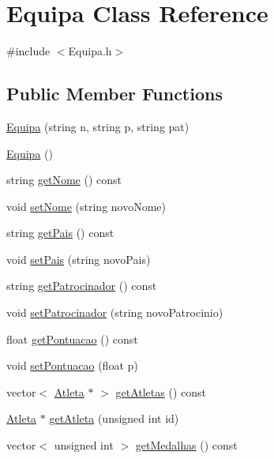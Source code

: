 \hypertarget{class_equipa}{}\section{Equipa Class Reference}
\label{class_equipa}


{\ttfamily \#include $<$Equipa.\+h$>$}

\subsection*{Public Member Functions}
\begin{DoxyCompactItemize}
\item 
\hyperlink{class_equipa_a2721072fa0d6b4451d22fdfe3c3f3c0e}{Equipa} (string n, string p, string pat)
\item 
\hyperlink{class_equipa_a71e864835165c2be093784ef38fd634d}{Equipa} ()
\item 
string \hyperlink{class_equipa_a9d20d0c8daa94e7562c5ea173337a224}{get\+Nome} () const 
\item 
void \hyperlink{class_equipa_a13e90216eb9ca9d6b2c144295a2b6730}{set\+Nome} (string novo\+Nome)
\item 
string \hyperlink{class_equipa_ac0d2108875ef6ed5833bfbd2f9921625}{get\+Pais} () const 
\item 
void \hyperlink{class_equipa_a2360f13c75fdcf75395cef84a9d0f589}{set\+Pais} (string novo\+Pais)
\item 
string \hyperlink{class_equipa_a241ab40d7dfe77af53b834482c79b94f}{get\+Patrocinador} () const 
\item 
void \hyperlink{class_equipa_aca1891ba657401bff00291ab22bb430a}{set\+Patrocinador} (string novo\+Patrocinio)
\item 
float \hyperlink{class_equipa_aeccebdc0af7faf1553e7c7eefe9e66af}{get\+Pontuacao} () const 
\item 
void \hyperlink{class_equipa_a9b63be5bd83117f9bd71bfa6e140da0d}{set\+Pontuacao} (float p)
\item 
vector$<$ \hyperlink{class_atleta}{Atleta} $\ast$ $>$ \hyperlink{class_equipa_a24c4de83cc1171ce42f442ef7be8a7c4}{get\+Atletas} () const 
\item 
\hyperlink{class_atleta}{Atleta} $\ast$ \hyperlink{class_equipa_a9b3eaddbfd2944cffb37f242cba00fa1}{get\+Atleta} (unsigned int id)
\item 
vector$<$ unsigned int $>$ \hyperlink{class_equipa_a899dadeca3643a28b52487c6fb052c1f}{get\+Medalhas} () const 
\item 

\end{DoxyCompactItemize}
